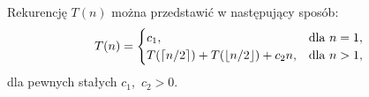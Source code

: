 \subsection{} %
Rekurencję $T(n)$ można przedstawić w następujący sposób:
\[
	T(n) =
	\begin{cases}
		c_1, & \hbox{dla }n=1, \\
		T(\lceil n/2\rceil)+T(\lfloor n/2\rfloor)+c_2n, & \hbox{dla }n>1,
	\end{cases}
\]
dla pewnych stałych $c_1$,~$c_2>0$.
% 
% 

